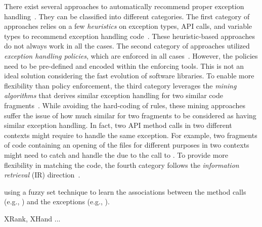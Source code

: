 There exist several approaches to automatically recommend proper
exception
handling~\cite{barbosa-bsse12,chanchal-scam14,barbosa-tse18,barbosa-tse16,xrank-fse20,throw-ase22}. They
can be classified into different categories. The first category of
approaches relies on a few {\em heuristics} on exception types, API
calls, and variable types to recommend exception handling
code~\cite{barbosa-bsse12}. These heuristic-based approaches do not
always work in all the cases. The second category of approaches
utilized {\em exception handling policies}, which are enforced in all
cases~\cite{barbosa-tse16,barbosa-saner18}. However, the policies need
to be pre-defined and encoded within the enforcing tools.  This is not
an ideal solution considering the fast evolution of software
libraries. To enable more flexibility than policy enforcement, the
third category leverages the {\em mining algorithms} that derives
similar exception handling for two similar code
fragments~\cite{chanchal-scam14}. While avoiding the hard-coding of
rules, these mining approaches suffer the issue of how much similar
for two fragments to be considered as having similar exception
handling. In fact, two API method calls in two different contexts
might require to handle the same exception. For example, two fragments
of code containing an opening of the files for different purposes in
two contexts might need to catch and handle the  due
to the call to . To provide more
flexibility in matching the code, the fourth category follows the {\em
  information retrieval} (IR) direction~\cite{xrank-fse20}.

using a fuzzy set technique to learn the associations between the
method calls (e.g., ) and the exceptions (e.g., ).

XRank, XHand ...

